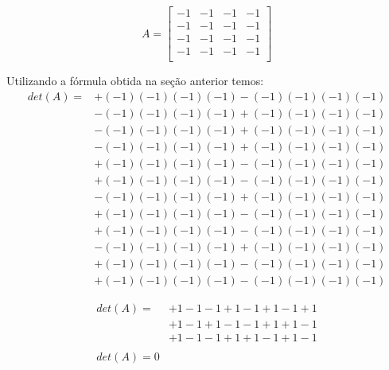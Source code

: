 \documentclass[12pt, a4paper]{article}
\begin{document}
\begin{equation*}
A = 
\begin{bmatrix}
-1 & -1 & -1 & -1\\
-1 & -1 & -1 & -1\\
-1 & -1 & -1 & -1\\
-1 & -1 & -1 & -1\\
\end{bmatrix}
\end{equation*}

Utilizando a fórmula obtida na seção anterior temos:
\newline
\begin{equation*}
\begin{aligned}
det(A) = & + (-1)(-1)(-1)(-1) 
- (-1)(-1)(-1)(-1) \\
& - (-1)(-1)(-1)(-1) 
+ (-1)(-1)(-1)(-1) \\
& - (-1)(-1)(-1)(-1) 
+ (-1)(-1)(-1)(-1) \\
& - (-1)(-1)(-1)(-1)
+ (-1)(-1)(-1)(-1) \\
& + (-1)(-1)(-1)(-1) 
- (-1)(-1)(-1)(-1) \\
& + (-1)(-1)(-1)(-1)
- (-1)(-1)(-1)(-1) \\
& - (-1)(-1)(-1)(-1) 
+ (-1)(-1)(-1)(-1) \\
& + (-1)(-1)(-1)(-1) 
- (-1)(-1)(-1)(-1) \\
& + (-1)(-1)(-1)(-1) 
- (-1)(-1)(-1)(-1) \\
& - (-1)(-1)(-1)(-1) 
+ (-1)(-1)(-1)(-1) \\
& + (-1)(-1)(-1)(-1) 
- (-1)(-1)(-1)(-1) \\
& + (-1)(-1)(-1)(-1)
- (-1)(-1)(-1)(-1)
\end{aligned}
\end{equation*}

\begin{equation*}
\begin{aligned}
det(A) = & + 1 - 1 - 1 + 1 - 1 + 1 - 1 + 1 \\
& + 1 - 1  + 1 - 1 - 1 + 1 + 1 - 1 \\ 
& + 1 - 1 - 1 + 1 + 1 - 1 + 1 - 1
\\\\
det(A) = 0
\end{aligned}
\end{equation*}
\end{document}
